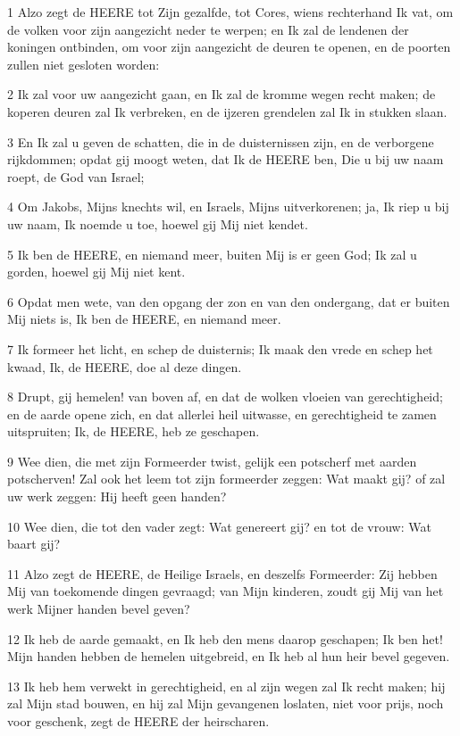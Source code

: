 \par 1 Alzo zegt de HEERE tot Zijn gezalfde, tot Cores, wiens rechterhand Ik vat, om de volken voor zijn aangezicht neder te werpen; en Ik zal de lendenen der koningen ontbinden, om voor zijn aangezicht de deuren te openen, en de poorten zullen niet gesloten worden:
\par 2 Ik zal voor uw aangezicht gaan, en Ik zal de kromme wegen recht maken; de koperen deuren zal Ik verbreken, en de ijzeren grendelen zal Ik in stukken slaan.
\par 3 En Ik zal u geven de schatten, die in de duisternissen zijn, en de verborgene rijkdommen; opdat gij moogt weten, dat Ik de HEERE ben, Die u bij uw naam roept, de God van Israel;
\par 4 Om Jakobs, Mijns knechts wil, en Israels, Mijns uitverkorenen; ja, Ik riep u bij uw naam, Ik noemde u toe, hoewel gij Mij niet kendet.
\par 5 Ik ben de HEERE, en niemand meer, buiten Mij is er geen God; Ik zal u gorden, hoewel gij Mij niet kent.
\par 6 Opdat men wete, van den opgang der zon en van den ondergang, dat er buiten Mij niets is, Ik ben de HEERE, en niemand meer.
\par 7 Ik formeer het licht, en schep de duisternis; Ik maak den vrede en schep het kwaad, Ik, de HEERE, doe al deze dingen.
\par 8 Drupt, gij hemelen! van boven af, en dat de wolken vloeien van gerechtigheid; en de aarde opene zich, en dat allerlei heil uitwasse, en gerechtigheid te zamen uitspruiten; Ik, de HEERE, heb ze geschapen.
\par 9 Wee dien, die met zijn Formeerder twist, gelijk een potscherf met aarden potscherven! Zal ook het leem tot zijn formeerder zeggen: Wat maakt gij? of zal uw werk zeggen: Hij heeft geen handen?
\par 10 Wee dien, die tot den vader zegt: Wat genereert gij? en tot de vrouw: Wat baart gij?
\par 11 Alzo zegt de HEERE, de Heilige Israels, en deszelfs Formeerder: Zij hebben Mij van toekomende dingen gevraagd; van Mijn kinderen, zoudt gij Mij van het werk Mijner handen bevel geven?
\par 12 Ik heb de aarde gemaakt, en Ik heb den mens daarop geschapen; Ik ben het! Mijn handen hebben de hemelen uitgebreid, en Ik heb al hun heir bevel gegeven.
\par 13 Ik heb hem verwekt in gerechtigheid, en al zijn wegen zal Ik recht maken; hij zal Mijn stad bouwen, en hij zal Mijn gevangenen loslaten, niet voor prijs, noch voor geschenk, zegt de HEERE der heirscharen.
